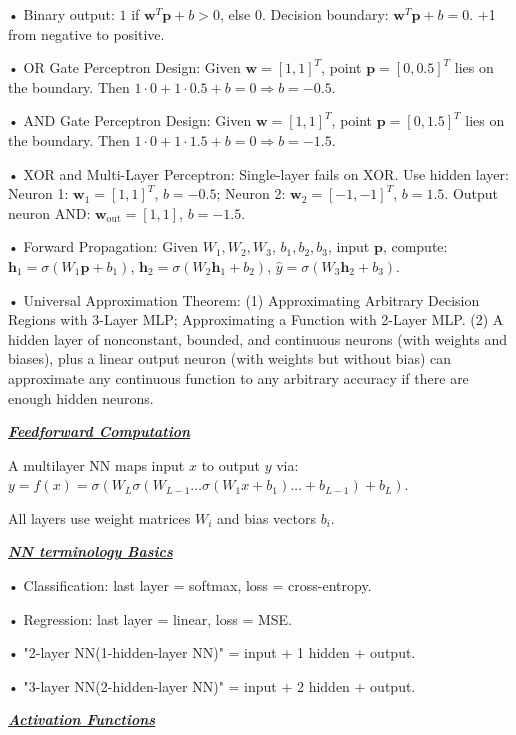 \documentclass[10pt]{article}
\newcommand{\bulletPoint}[1]{\ul{\textit{\textbf{#1}}}}
\begin{document}
\begin{multicols*}{3}
• Binary output: $1$ if $\mathbf{w}^T \mathbf{p} + b > 0$, else $0$. \quad
Decision boundary: $\mathbf{w}^T \mathbf{p} + b = 0$. \quad +1 from negative to positive.

• OR Gate Perceptron Design:
Given $\mathbf{w} = [1, 1]^T$, point $\mathbf{p} = [0, 0.5]^T$ lies on the boundary. \quad
Then $1 \cdot 0 + 1 \cdot 0.5 + b = 0 \Rightarrow b = -0.5$. 

• AND Gate Perceptron Design:
Given $\mathbf{w} = [1, 1]^T$, point $\mathbf{p} = [0, 1.5]^T$ lies on the boundary. \quad
Then $1 \cdot 0 + 1 \cdot 1.5 + b = 0 \Rightarrow b = -1.5$. 

• XOR and Multi-Layer Perceptron:
Single-layer fails on XOR. Use hidden layer: \quad
Neuron 1: $\mathbf{w}_1 = [1,1]^T$, $b = -0.5$; Neuron 2: $\mathbf{w}_2 = [-1,-1]^T$, $b = 1.5$. \quad
Output neuron AND: $\mathbf{w}_{\text{out}} = [1,1]$, $b = -1.5$. 

• Forward Propagation: 
Given $W_1, W_2, W_3$, $b_1, b_2, b_3$, input $\mathbf{p}$, compute: \quad
$\mathbf{h}_1 = \sigma(W_1 \mathbf{p} + b_1)$, $\mathbf{h}_2 = \sigma(W_2 \mathbf{h}_1 + b_2)$, $\hat{y} = \sigma(W_3 \mathbf{h}_2 + b_3)$.

• Universal Approximation Theorem:
(1) Approximating Arbitrary Decision Regions with 3-Layer MLP; Approximating a Function with 2-Layer MLP.
(2) A hidden layer of nonconstant, bounded, and continuous neurons (with weights
and biases), plus a linear output neuron (with weights but without bias) can
approximate any continuous function to any arbitrary accuracy if there are
enough hidden neurons. 

\bulletPoint{Feedforward Computation} \quad

A multilayer NN maps input $x$ to output $y$ via: 
$y = f(x) = \sigma(W_L \sigma(W_{L-1} \dots \sigma(W_1 x + b_1) \dots + b_{L-1}) + b_L)$. \quad

All layers use weight matrices $W_i$ and bias vectors $b_i$. 

\bulletPoint{NN terminology Basics} \quad

• Classification: last layer = softmax, loss = cross-entropy. \quad

• Regression: last layer = linear, loss = MSE. \quad

• "2-layer NN(1-hidden-layer NN)" = input + 1 hidden + output. \quad

• "3-layer NN(2-hidden-layer NN)" = input + 2 hidden + output.

\bulletPoint{Activation Functions} \quad


\end{multicols*}
\end{document}
